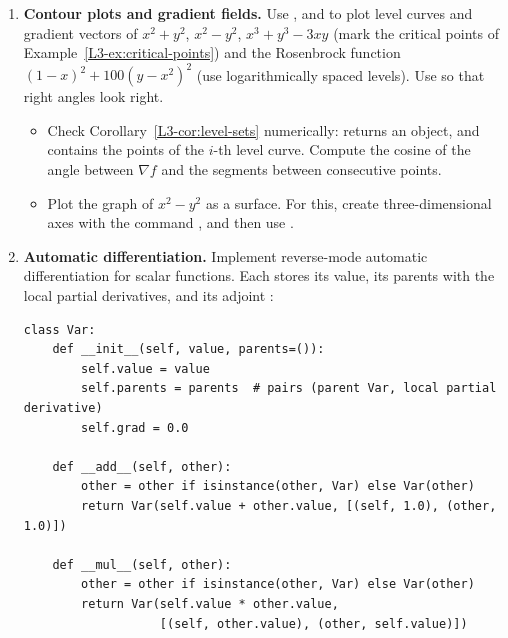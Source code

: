 \begin{enumerate}[label=\textbf{P\arabic*.}, leftmargin=*]
    \item \textbf{Contour plots and gradient fields.} Use ,  and  to plot level curves and gradient vectors of $x^2 + y^2$, $x^2 - y^2$, $x^3 + y^3 - 3xy$ (mark the critical points of Example~\ref{L3-ex:critical-points}) and the Rosenbrock function $(1 - x)^2 + 100(y - x^2)^2$ (use logarithmically spaced levels). Use  so that right angles look right.
    \begin{itemize}
        \item Check Corollary~\ref{L3-cor:level-sets} numerically:  returns an object, and  contains the points of the $i$-th level curve. Compute the cosine of the angle between $\nabla f$ and the segments between consecutive points.
        \item Plot the graph of $x^2 - y^2$ as a surface. For this, create three-dimensional axes with the command , and then use .
    \end{itemize}

    \item \homework{} \textbf{Automatic differentiation.} Implement reverse-mode automatic differentiation for scalar functions. Each  stores its value, its parents with the local partial derivatives, and its adjoint :
\begin{lstlisting}
class Var:
    def __init__(self, value, parents=()):
        self.value = value
        self.parents = parents  # pairs (parent Var, local partial derivative)
        self.grad = 0.0

    def __add__(self, other):
        other = other if isinstance(other, Var) else Var(other)
        return Var(self.value + other.value, [(self, 1.0), (other, 1.0)])

    def __mul__(self, other):
        other = other if isinstance(other, Var) else Var(other)
        return Var(self.value * other.value,
                   [(self, other.value), (other, self.value)])


\end{lstlisting}
\end{enumerate}

